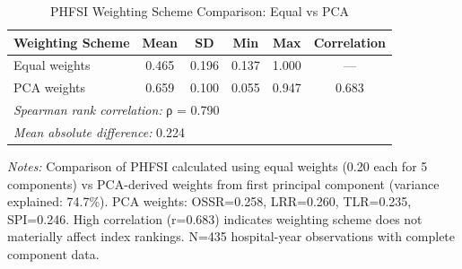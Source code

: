 \begin{table}[htbp]
\centering
\caption{PHFSI Weighting Scheme Comparison: Equal vs PCA}
\label{tab:pca_comparison}
\footnotesize
\begin{threeparttable}
\begin{tabular}{lccccc}
\toprule
Weighting Scheme & Mean & SD & Min & Max & Correlation \\
\midrule
Equal weights & 0.465 & 0.196 & 0.137 & 1.000 & — \\
PCA weights & 0.659 & 0.100 & 0.055 & 0.947 & 0.683 \\
\midrule
\multicolumn{6}{l}{\textit{Spearman rank correlation: } ρ = 0.790} \\
\multicolumn{6}{l}{\textit{Mean absolute difference: } 0.224} \\
\bottomrule
\end{tabular}
\begin{tablenotes}
\small
\item \textit{Notes:} Comparison of PHFSI calculated using equal weights (0.20 each for 5 components) vs PCA-derived weights from first principal component (variance explained: 74.7\%). PCA weights: OSSR=0.258, LRR=0.260, TLR=0.235, SPI=0.246. High correlation (r=0.683) indicates weighting scheme does not materially affect index rankings. N=435 hospital-year observations with complete component data.
\end{tablenotes}
\end{threeparttable}
\end{table}